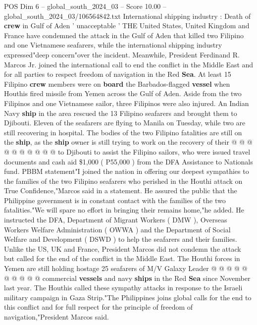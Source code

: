 \begin{textsample}{POS Dim 6 – global\_south\_2024\_03 – Score 10.00 – global\_south\_2024\_03/106564842.txt}  \label{ex:f6_pos_062}
International shipping industry : Death of \textbf{crew} in Gulf of Aden ' unacceptable ' THE United States, United Kingdom and France have condemned the attack in the Gulf of Aden that killed two Filipino and one Vietnamese seafarers, while the international shipping industry expressed"deep concern"over the incident.
Meanwhile, President Ferdinand R.
Marcos Jr. joined the international call to end the conflict in the Middle East and for all parties to respect freedom of navigation in the Red \textbf{Sea}.
At least 15 Filipino \textbf{crew} members were on \textbf{board} the Barbados-flagged \textbf{vessel} when Houthis fired missile from Yemen across the Gulf of Aden.
Aside from the two Filipinos and one Vietnamese sailor, three Filipinos were also injured.
An Indian Navy \textbf{ship} in the area rescued the 13 Filipino seafarers and brought them to Djibouti.
Eleven of the seafarers are flying to Manila on Tuesday, while two are still recovering in hospital.
The bodies of the two Filipino fatalities are still on the \textbf{ship}, as the \textbf{ship} owner is still trying to work on the recovery of their @ @ @ @ @ @ @ @ @ @ to Djibouti to assist the Filipino sailors, who were issued travel documents and cash aid \$1,000 ( P55,000 ) from the DFA Assistance to Nationals fund.
PBBM statement"I joined the nation in offering our deepest sympathies to the families of the two Filipino seafarers who perished in the Houthi attack on True Confidence,"Marcos said in a statement.
He assured the public that the Philippine government is in constant contact with the families of the two fatalities."We will spare no effort in bringing their remains home,"he added.
He instructed the DFA, Department of Migrant Workers ( DMW ), Overseas Workers Welfare Administration ( OWWA ) and the Department of Social Welfare and Development ( DSWD ) to help the seafarers and their families.
Unlike the US, UK and France, President Marcos did not condemn the attack but called for the end of the conflict in the Middle East.
The Houthi forces in Yemen are still holding hostage 25 seafarers of M/V Galaxy Leader @ @ @ @ @ @ @ @ @ @ commercial \textbf{vessels} and navy \textbf{ships} in the Red \textbf{Sea} since November last year.
The Houthis called these sympathy attacks in response to the Israeli military campaign in Gaza Strip."The Philippines joins global calls for the end to this conflict and for full respect for the principle of freedom of navigation,"President Marcos said.

\end{textsample}
